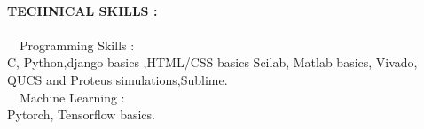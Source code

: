 \documentclass[1pt]{article}
\begin{document}
\begin{flushleft}
		\hspace{1cm}\\ \hspace{1cm}
		
		{\small \textbf{TECHNICAL SKILLS :}}\\ \ \\
		\textbullet \ \  Programming Skills :  \\ \hspace{1.4cm}C, Python,django basics ,HTML/CSS basics Scilab, Matlab basics, Vivado, QUCS and Proteus simulations,Sublime.\\
		
		\textbullet \ \ Machine Learning :  \\ \hspace{1.4cm}Pytorch, Tensorflow basics.\\
		
		
	
	\end{flushleft}
	
\end{document}
